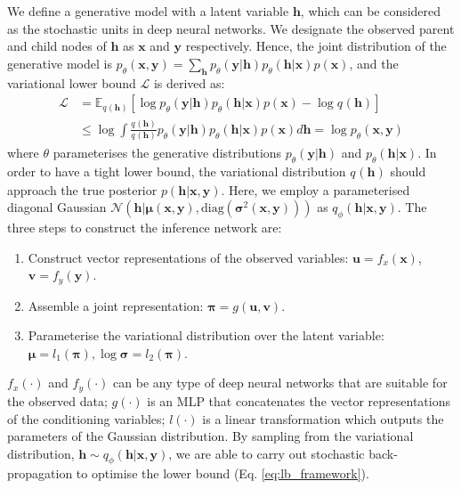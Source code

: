 \documentclass{article}
\newcommand{\tmmathbf}[1]{\ensuremath{\boldsymbol{#1}}}
\newenvironment{enumeratenumeric}{\begin{enumerate}[1.] }{\end{enumerate}}
\begin{document}
We define a generative model with a latent variable $\tmmathbf{h}$, which can be considered as the stochastic units in deep neural networks. We designate the observed parent and child nodes of $\tmmathbf{h}$ as $\tmmathbf{x}$ and $\tmmathbf{y}$ respectively. Hence, the joint distribution of the generative model is $p_{\theta}( \tmmathbf{x}, \tmmathbf{y})= \sum_{\tmmathbf{h}} p_{\theta}(\tmmathbf{y}|\tmmathbf{h}) p_{\theta}(\tmmathbf{h}|\tmmathbf{x}) p(\tmmathbf{x}) $, and the variational lower bound $\mathcal{L}$ is derived as:
\begin{align}
  \mathcal{L} & = \mathbb{E}_{q_{ } ( \tmmathbf{h})}  [\log p_{\theta}
  ( \tmmathbf{y} | \tmmathbf{h}) p_{\theta} ( \tmmathbf{h} |
  \tmmathbf{\tmmathbf{x}}) p ( \tmmathbf{x}) - \log q_{ } (
  \tmmathbf{h})] \label{eq:lb_framework}\\
			& \leqslant \log \int \frac{q_{ } ( \tmmathbf{h})}{q_{ } ( \tmmathbf{h})}
  p_{\theta} ( \tmmathbf{y} | \tmmathbf{h}) p_{\theta} ( \tmmathbf{h} |
  \tmmathbf{x}) p ( \tmmathbf{x}) d \tmmathbf{h} = \log p_{\theta} ( \tmmathbf{x}, \tmmathbf{y}) \nonumber   
\end{align}
where $\theta$ parameterises the generative distributions $ p_{\theta} ( \tmmathbf{y} | \tmmathbf{h})$  and $p_{\theta} ( \tmmathbf{h} | \tmmathbf{\tmmathbf{x}})$. 
In order to have a tight lower bound, the variational distribution $q_{ } ( \tmmathbf{h})$ should approach the true posterior $p ( \tmmathbf{h} | \tmmathbf{\tmmathbf{x}}, \tmmathbf{y})$.
Here, we employ a parameterised diagonal Gaussian  $\mathcal{N} ( \tmmathbf{h} | \tmmathbf{\mu} (\tmmathbf{\tmmathbf{x}}, \tmmathbf{y}), \mathrm{diag} ( \tmmathbf{\sigma}^2 (\tmmathbf{\tmmathbf{x}}, \tmmathbf{y})))$ as $q_{\phi} ( \tmmathbf{h} | \tmmathbf{\tmmathbf{x}}, \tmmathbf{y})$. The three steps to construct the inference network are:
\begin{enumeratenumeric}
 \setlength\itemsep{-0.01cm}
  \item Construct vector representations of the observed variables:
  $\tmmathbf{u} = f_x ( \tmmathbf{x})$, $\tmmathbf{v} = f_y ( \tmmathbf{y})$.
  \item Assemble a joint representation:
  $\tmmathbf{\pi} = g ( \tmmathbf{u}, \tmmathbf{v})$.
  \item Parameterise the variational distribution over the latent variable:
  $\tmmathbf{\mu} = l_1 ( \tmmathbf{\pi}), \log \tmmathbf{\sigma} = l_2 (
  \tmmathbf{\pi})$.
\end{enumeratenumeric}
$f_x (\cdot)$ and $f_y (\cdot)$ can be any type of deep neural networks that are suitable for the observed data; $g (\cdot)$ is an MLP that concatenates the vector representations of the conditioning variables; $l(\cdot)$ is a linear transformation which outputs the parameters of the Gaussian distribution. 
By sampling from the variational distribution, $\tmmathbf{h} \sim q_{\phi} ( \tmmathbf{h} | \tmmathbf{\tmmathbf{x}}, \tmmathbf{y})$, we are able to carry out stochastic back-propagation to optimise the lower bound (Eq. \ref{eq:lb_framework}). 
\end{document}
